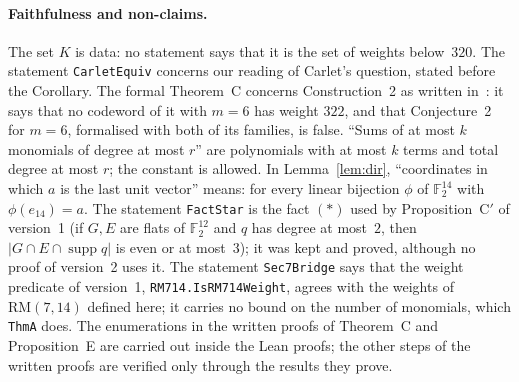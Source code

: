 \documentclass[11pt]{article}
\theoremstyle{remark}
\newcommand{\F}{\mathbb F}
\newcommand{\RM}{\mathrm{RM}}
\DeclareMathOperator{\supp}{supp}
\begin{document}
\paragraph{Faithfulness and non-claims.}
The set $K$ is data: no statement says that it is the set of weights
below~$320$. The statement \texttt{CarletEquiv} concerns our reading of
Carlet's question, stated before the Corollary. The formal Theorem~C concerns
Construction~2 as written in~\cite{lw}: it says that no codeword of it with
$m=6$ has weight $322$, and that Conjecture~2 for $m=6$, formalised with both
of its families, is false. ``Sums of at most
$k$ monomials of degree at most $r$'' are polynomials with at most $k$ terms
and total degree at most $r$; the constant is allowed. In Lemma~\ref{lem:dir},
``coordinates in which $a$ is the last unit vector'' means: for every linear
bijection $\phi$ of $\F_2^{14}$ with $\phi(e_{14})=a$. The statement
\texttt{FactStar} is the fact $(\ast)$ used by Proposition~C$'$ of version~1
(if $G,E$ are flats of $\F_2^{12}$ and $q$ has degree at most~$2$, then
$|G\cap E\cap\supp q|$ is even or at most~$3$); it was kept and proved,
although no proof of version~2 uses it. The statement
\texttt{Sec7Bridge} says that the weight predicate of version~1,
\texttt{RM714.IsRM714Weight}, agrees with the weights of $\RM(7,14)$ defined
here; it carries no bound on the number of monomials, which \texttt{ThmA}
does. The enumerations in the written proofs of Theorem~C and Proposition~E are
carried out inside the Lean proofs; the other steps of the written proofs are
verified only through the results they prove.
\end{document}
